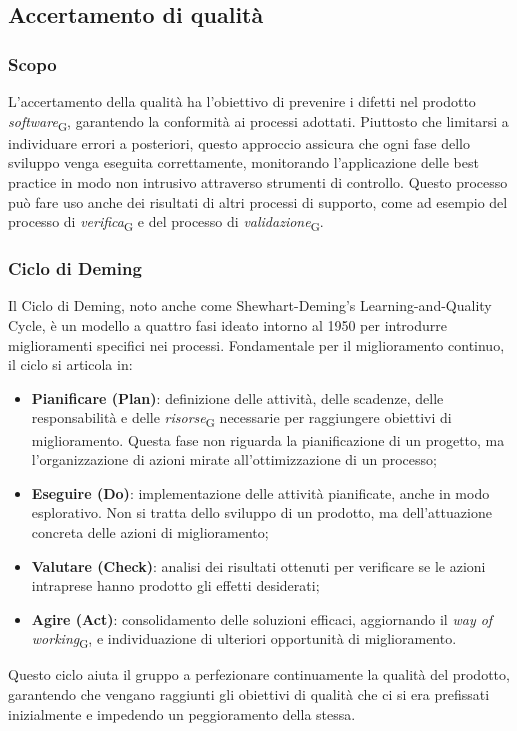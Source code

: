 \subsection{Accertamento di qualità}
\subsubsection{Scopo}
L'accertamento della qualità ha l'obiettivo di prevenire i difetti nel prodotto \textit{software}\textsubscript{G}, garantendo la conformità ai processi adottati. Piuttosto che limitarsi a individuare errori a posteriori, questo approccio assicura che ogni fase dello sviluppo venga eseguita correttamente, monitorando l’applicazione delle best practice in modo non intrusivo attraverso strumenti di controllo. Questo processo può fare uso anche dei risultati di altri processi di supporto, come ad esempio del processo di \textit{verifica}\textsubscript{G} e del processo di \textit{validazione}\textsubscript{G}.

\subsubsection{Ciclo di Deming}
Il Ciclo di Deming, noto anche come Shewhart-Deming’s Learning-and-Quality Cycle, è un modello a quattro fasi ideato intorno al 1950 per introdurre miglioramenti specifici nei processi. Fondamentale per il miglioramento continuo, il ciclo si articola in:  
\begin{itemize}
    \item \textbf{Pianificare (Plan)}: definizione delle attività, delle scadenze, delle responsabilità e delle \textit{risorse}\textsubscript{G} necessarie per raggiungere obiettivi di miglioramento. Questa fase non riguarda la pianificazione di un progetto, ma l’organizzazione di azioni mirate all’ottimizzazione di un processo;
    \item \textbf{Eseguire (Do)}: implementazione delle attività pianificate, anche in modo esplorativo. Non si tratta dello sviluppo di un prodotto, ma dell’attuazione concreta delle azioni di miglioramento;
    \item \textbf{Valutare (Check)}: analisi dei risultati ottenuti per verificare se le azioni intraprese hanno prodotto gli effetti desiderati;
    \item \textbf{Agire (Act)}: consolidamento delle soluzioni efficaci, aggiornando il \textit{way of working}\textsubscript{G}, e individuazione di ulteriori opportunità di miglioramento.
\end{itemize}
Questo ciclo aiuta il gruppo a perfezionare continuamente la qualità del prodotto, garantendo che vengano raggiunti gli obiettivi di qualità che ci si era prefissati inizialmente e impedendo un peggioramento della stessa.

